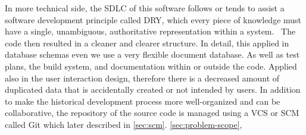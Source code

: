 In more technical side, the \ac{SDLC} of this software follows or tends to assist a software development principle called \ac{DRY},
which every piece of knowledge must have a single, unambiguous, authoritative representation within a system.~\autocite{Hunt1999Pragmatic}
The code then resulted in a cleaner and clearer structure.
In detail, this applied in database schemas even we use a very flexible document database.
As well as test plans, the build system, and documentation within or outside the code.
Applied also in the user interaction design, therefore there is a decreased amount of duplicated data that is accidentally created or not intended by users.
In addition to make the historical development process more well-organized and can be collaborative, the repository of the source code is managed using a \ac{VCS} or \ac{SCM} called Git which later described in \autoref{sec:scm}.
\autoref{sec:problem-scope},
